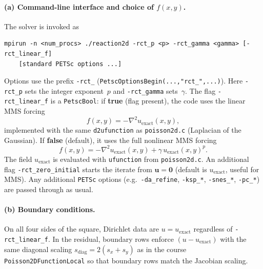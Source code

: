 \documentclass[11pt]{article}
\begin{document}
\paragraph{(a) Command-line interface and choice of $f(x,y)$.}
The solver is invoked as
\begin{verbatim}
mpirun -n <num_procs> ./reaction2d -rct_p <p> -rct_gamma <gamma> [-rct_linear_f]
    [standard PETSc options ...]
\end{verbatim}
Options use the prefix \texttt{-rct\_} (\texttt{PetscOptionsBegin(...,"rct\_",...)}). Here \texttt{-rct\_p} sets the integer exponent~$p$ and \texttt{-rct\_gamma} sets~$\gamma$. The flag \texttt{-rct\_linear\_f} is a \texttt{PetscBool}: if \textbf{true} (flag present), the code uses the linear MMS forcing
\begin{displaymath}
  f(x,y) = -\nabla^2 u_{\mathrm{exact}}(x,y),
\end{displaymath}
implemented with the same \texttt{d2ufunction} as \texttt{poisson2d.c} (Laplacian of the Gaussian). If \textbf{false} (default), it uses the full nonlinear MMS forcing
\begin{displaymath}
  f(x,y) = -\nabla^2 u_{\mathrm{exact}}(x,y) + \gamma\, u_{\mathrm{exact}}(x,y)^{p}.
\end{displaymath}
The field $u_{\mathrm{exact}}$ is evaluated with \texttt{ufunction} from \texttt{poisson2d.c}. An additional flag \texttt{-rct\_zero\_initial} starts the iterate from $\mathbf{u}=\mathbf{0}$ (default is $u_{\mathrm{exact}}$, useful for MMS). Any additional \texttt{PETSc} options (e.g.\ \texttt{-da\_refine}, \texttt{-ksp\_*}, \texttt{-snes\_*}, \texttt{-pc\_*}) are passed through as usual.

\paragraph{(b) Boundary conditions.}
On all four sides of the square, Dirichlet data are $u = u_{\mathrm{exact}}$ regardless of \texttt{-rct\_linear\_f}. In the residual, boundary rows enforce $(u - u_{\mathrm{exact}})$ with the same diagonal scaling $s_{\mathrm{diag}}=2(s_x+s_y)$ as in the course \texttt{Poisson2DFunctionLocal} so that boundary rows match the Jacobian scaling.
\end{document}
